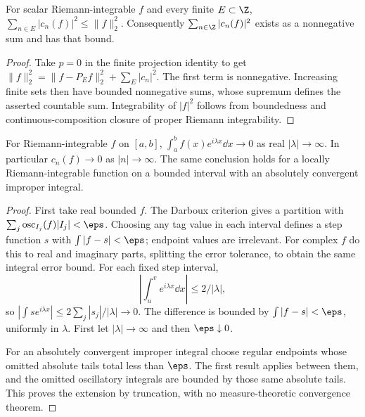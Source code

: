 \begin{theorem}
For scalar Riemann-integrable $f$ and every finite $E\subset\Z$,
$\sum_{n\in E}|c_n(f)|^2\leq\|f\|_2^2$.
Consequently $\sum_{n\in\Z}|c_n(f)|^2$ exists as a nonnegative sum and
has that bound.
\end{theorem}
\begin{proof}
Take $p=0$ in the finite projection identity to get
$\|f\|_2^2=\|f-P_Ef\|_2^2+\sum_E|c_n|^2$.
The first term is nonnegative. Increasing finite sets then have bounded
nonnegative sums, whose supremum defines the asserted countable sum.
Integrability of $|f|^2$ follows from boundedness and continuous-composition
closure of proper Riemann integrability.
\end{proof}

\begin{theorem}
For Riemann-integrable $f$ on $[a,b]$,
$\int_a^b f(x)e^{i\lambda x}\dd x\to0$ as real $|\lambda|\to\infty$.
In particular $c_n(f)\to0$ as $|n|\to\infty$.
The same conclusion holds for a locally Riemann-integrable function on a
bounded interval with an absolutely convergent improper integral.
\end{theorem}
\begin{proof}
First take real bounded $f$. The Darboux criterion gives a partition with
$\sum_j\operatorname{osc}_{I_j}(f)|I_j|<\eps$. Choosing any tag value in
each interval defines a step function $s$ with $\int|f-s|<\eps$; endpoint
values are irrelevant. For complex $f$ do this to real and imaginary parts,
splitting the error tolerance, to obtain the same integral error bound.
For each fixed step interval,
\[
 \left|\int_u^v e^{i\lambda x}\dd x\right|\leq2/|\lambda|,
\]
so $|\int s e^{i\lambda x}|\leq2\sum_j|s_j|/|\lambda|\to0$.
The difference is bounded by $\int|f-s|<\eps$, uniformly in $\lambda$.
First let $|\lambda|\to\infty$ and then $\eps\downarrow0$.

For an absolutely convergent improper integral choose regular endpoints
whose omitted absolute tails total less than $\eps$. The first result
applies between them, and the omitted oscillatory integrals are bounded by
those same absolute tails. This proves the extension by truncation, with
no measure-theoretic convergence theorem.
\end{proof}

